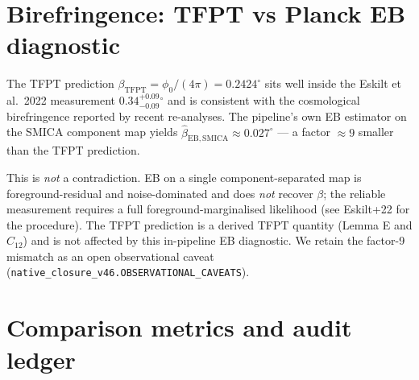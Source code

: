 \section{Birefringence: TFPT vs Planck EB diagnostic}
\label{sec:birefringence}

The TFPT prediction \(\beta_{\mathrm{TFPT}}=\phi_0/(4\pi)
=0.2424^\circ\) sits well inside the Eskilt et al.\ 2022 measurement
\(0.34^{+0.09}_{-0.09}{}^\circ\) and is consistent with the cosmological
birefringence reported by recent re-analyses.  The pipeline's own EB
estimator on the SMICA component map yields
\(\hat\beta_{\mathrm{EB,SMICA}}\approx 0.027^\circ\) --- a factor
\(\approx 9\) smaller than the TFPT prediction.

This is \emph{not} a contradiction.  EB on a single component-separated
map is foreground-residual and noise-dominated and does \emph{not}
recover \(\beta\); the reliable measurement requires a full
foreground-marginalised likelihood (see Eskilt+22 for the procedure).
The TFPT prediction is a derived TFPT quantity (Lemma E and
\(C_{12}\)) and is not affected by this in-pipeline EB diagnostic.
We retain the factor-9 mismatch as an open observational caveat
(\texttt{native\_closure\_v46.OBSERVATIONAL\_CAVEATS}).

\section{Comparison metrics and audit ledger}
\label{sec:metrics}

